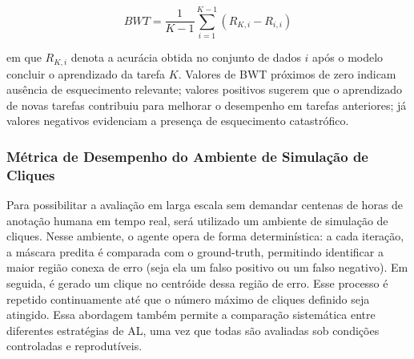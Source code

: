 
\begin{equation}
BWT = \frac{1}{K-1} \sum_{i=1}^{K-1} (R_{K,i} - R_{i,i})
\end{equation}

em que $R_{K,i}$ denota a acurácia obtida no conjunto de dados $i$ após o modelo concluir o aprendizado da tarefa $K$. Valores de \ac{BWT} próximos de zero indicam ausência de esquecimento relevante; valores positivos sugerem que o aprendizado de novas tarefas contribuiu para melhorar o desempenho em tarefas anteriores; já valores negativos evidenciam a presença de esquecimento catastrófico.



\subsubsection{Métrica de Desempenho do Ambiente de Simulação de Cliques}

Para possibilitar a avaliação em larga escala sem demandar centenas de horas de anotação humana em tempo real, será utilizado um ambiente de simulação de cliques. Nesse ambiente, o agente opera de forma determinística: a cada iteração, a máscara predita é comparada com o ground-truth, permitindo identificar a maior região conexa de erro (seja ela um falso positivo ou um falso negativo). Em seguida, é gerado um clique no centróide dessa região de erro. Esse processo é repetido continuamente até que o número máximo de cliques definido seja atingido. Essa abordagem também permite a comparação sistemática entre diferentes estratégias de \ac{AL}, uma vez que todas são avaliadas sob condições controladas e reprodutíveis.




